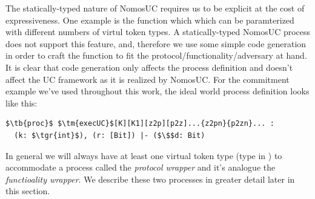 The statically-typed nature of NomosUC requires us to be explicit at the cost of expressiveness. One example is the  function which which can be paramterized with different numbers of virtul token types. 
A statically-typed NomosUC process does not support this feature, and, therefore we use some simple code generation in order to craft the  function to fit the protocol/functionality/adversary at hand.
It is clear that code generation only affects the process definition and doesn't affect the UC framework as it is realized by NomosUC.
For the commitment example we've used throughout this work, the ideal world  process definition looks like this:
\begin{lstlisting}[basicstyle=\footnotesize\BeraMonottFamily, frame=single, mathescape, caption={The process definition of the \msf{execUC} function.}]
$\tb{proc}$ $\tm{execUC}$[K][K1][z2p][p2z]...{z2pn}{p2zn}... :
  (k: $\tgr{int}$), (r: [Bit]) |- ($\$$d: Bit)
\end{lstlisting}
In general we will always have at least one virtual token type (type  in ) to accommodate a process called the \emph{protocol wrapper} and it's analogue the \emph{functioality wrapper}. 
We describe these two processes in greater detail later in this section.

